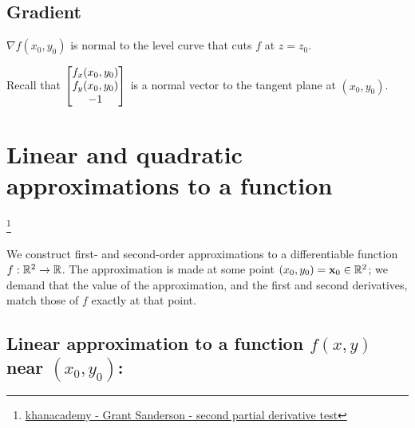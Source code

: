 

\subsection{Gradient}
$\nabla f(x_0, y_0)$ is normal to the level curve that cuts $f$ at $z = z_0$.

Recall that $\begin{bmatrix}f_x(x_0,y_0)\\f_y(x_0,y_0)\\-1\end{bmatrix}$ is a normal vector to the
tangent plane at $(x_0,y_0)$.


\section{Linear and quadratic approximations to a function}
\footnote{
  \href{https://www.khanacademy.org/math/multivariable-calculus/applications-of-multivariable-derivatives/optimizing-multivariable-functions/a/reasoning-behind-the-second-partial-derivative-test}{khanacademy - Grant Sanderson - second partial derivative test}
}




We construct first- and second-order approximations to a differentiable
function $f: \mathbb{R}^2 \rightarrow \mathbb{R}$. The approximation is made at some point
$(x_0, y_0) = \mathbf x_0 \in \mathbb{R}^2$; we demand that the value of the approximation, and the
first and second derivatives, match those of $f$ exactly at that point.

\subsection{Linear approximation to a function $f(x, y)$ near $(x_0, y_0)$:}

